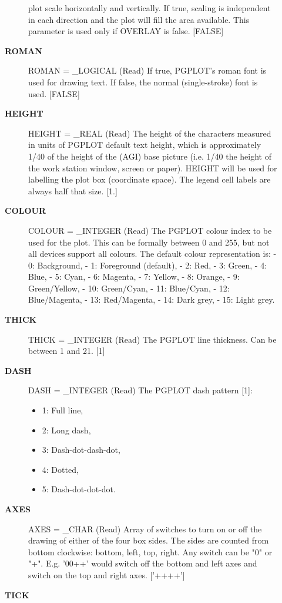 \begin{description}
\begin{description}
   plot scale horizontally and vertically. If true, scaling is
   independent in each direction and the plot will fill the area
   available. This parameter is used only if OVERLAY is false. [FALSE]
\item [\textbf{ROMAN}]
ROMAN = \_LOGICAL (Read)
   If true, PGPLOT's roman font is used for drawing text. If
   false, the normal (single-stroke) font is used. [FALSE]
\item [\textbf{HEIGHT}]
HEIGHT = \_REAL (Read)
   The height of the characters measured in units of PGPLOT
   default text height, which is approximately 1/40 of the height
   of the (AGI) base picture (i.e. 1/40 the height of the
   work station window, screen or paper). HEIGHT will be used for
   labelling the plot box (coordinate space). The legend cell
   labels are always half that size. [1.]
\item [\textbf{COLOUR}]
COLOUR = \_INTEGER (Read)
   The PGPLOT colour index to be used for the plot. This can be
   formally between 0 and 255, but not all devices support all
   colours. The default colour representation is:
   -  0: Background,           -  1: Foreground (default),
   -  2: Red,                  -  3: Green,
   -  4: Blue,                 -  5: Cyan,
   -  6: Magenta,              -  7: Yellow,
   -  8: Orange,               -  9: Green/Yellow,
   - 10: Green/Cyan,           - 11: Blue/Cyan,
   - 12: Blue/Magenta,         - 13: Red/Magenta,
   - 14: Dark grey,            - 15: Light grey.
\item [\textbf{THICK}]
THICK = \_INTEGER (Read)
   The PGPLOT line thickness. Can be between 1 and 21. [1]
\item [\textbf{DASH}]
DASH = \_INTEGER (Read)
   The PGPLOT dash pattern [1]:
   \begin{itemize}
   \item  1: Full line,
   \item  2: Long dash,
   \item  3: Dash-dot-dash-dot,
   \item  4: Dotted,
   \item  5: Dash-dot-dot-dot.
   \end{itemize}
\item [\textbf{AXES}]
AXES = \_CHAR (Read)
   Array of switches to turn on or off the drawing of either of
   the four box sides. The sides are counted from bottom
   clockwise: bottom, left, top, right. Any switch can be "0" or
   "+". E.g. '00++' would switch off the bottom and left axes and
   switch on the top and right axes. ['++++']
\item [\textbf{TICK}]

\end{description}
\end{description}
